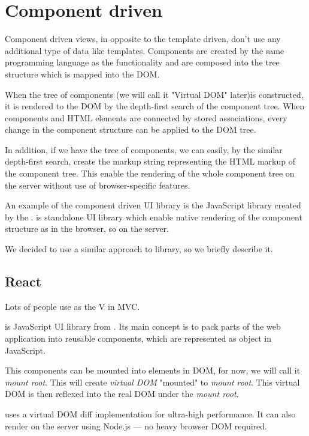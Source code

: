 \section{Component driven}\label{sec:existing-component}

  Component driven views, in opposite to the template driven, don't use any additional type of data like templates. 
  Components are created by the same programming language as the functionality and 
  are composed into the tree structure which is mapped into the DOM. 

  When the tree of components (we will call it "Virtual DOM" later)is constructed, 
  it is rendered to the DOM by the depth-first search of the component tree.
  When components and HTML elements are connected by stored associations, 
  every change in the component structure can be applied to the DOM tree. 

  In addition, if we have the tree of components, we can easily, by the similar depth-first search, 
  create the markup string representing the HTML markup of the component tree.
  This enable the rendering of the whole component tree on the server without use of browser-specific features.

  An example of the component driven UI library is the JavaScript library \react created by the \facebook.
  \react is standalone UI library which enable native rendering of the component structure as in the browser, so on the server.

  We decided to use a similar approach to \react library, so we briefly describe it.

  \subsection{React}\label{subsec:existing-component-react}
    
    Lots of people use \react as the V in MVC.\cite{react}

    \react is JavaScript UI library from \facebook. 
    Its main concept is to pack parts of the web application into reusable components, 
    which are represented as object in JavaScript. 

    This components can be mounted into elements in DOM, for now, we will call it \textit{mount root}. 
    This will create \textit{virtual DOM} "mounted" to \textit{mount root}. 
    This virtual DOM is then reflexed into the real DOM under the \textit{mount root}.

    \react uses a virtual DOM diff implementation for ultra-high performance. 
    It can also render on the server using Node.js — no heavy browser DOM required.\cite{react}

